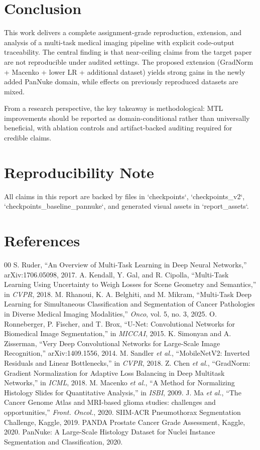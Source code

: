 \documentclass[conference]{IEEEtran}
\begin{document}
\section{Conclusion}
This work delivers a complete assignment-grade reproduction, extension, and analysis of a multi-task medical imaging pipeline with explicit code-output traceability. The central finding is that near-ceiling claims from the target paper are not reproducible under audited settings. The proposed extension (GradNorm + Macenko + lower LR + additional dataset) yields strong gains in the newly added PanNuke domain, while effects on previously reproduced datasets are mixed.

From a research perspective, the key takeaway is methodological: MTL improvements should be reported as domain-conditional rather than universally beneficial, with ablation controls and artifact-backed auditing required for credible claims.

\section*{Reproducibility Note}
All claims in this report are backed by files in `checkpoints`, `checkpoints\_v2`, `checkpoints\_baseline\_pannuke`, and generated visual assets in `report\_assets`.

\section*{References}

\begin{thebibliography}{00}
 S. Ruder, ``An Overview of Multi-Task Learning in Deep Neural Networks,'' arXiv:1706.05098, 2017.
 A. Kendall, Y. Gal, and R. Cipolla, ``Multi-Task Learning Using Uncertainty to Weigh Losses for Scene Geometry and Semantics,'' in \textit{CVPR}, 2018.
 M. Rhanoui, K. A. Belghiti, and M. Mikram, ``Multi-Task Deep Learning for Simultaneous Classification and Segmentation of Cancer Pathologies in Diverse Medical Imaging Modalities,'' \textit{Onco}, vol. 5, no. 3, 2025.
 O. Ronneberger, P. Fischer, and T. Brox, ``U-Net: Convolutional Networks for Biomedical Image Segmentation,'' in \textit{MICCAI}, 2015.
 K. Simonyan and A. Zisserman, ``Very Deep Convolutional Networks for Large-Scale Image Recognition,'' arXiv:1409.1556, 2014.
 M. Sandler \textit{et al.}, ``MobileNetV2: Inverted Residuals and Linear Bottlenecks,'' in \textit{CVPR}, 2018.
 Z. Chen \textit{et al.}, ``GradNorm: Gradient Normalization for Adaptive Loss Balancing in Deep Multitask Networks,'' in \textit{ICML}, 2018.
 M. Macenko \textit{et al.}, ``A Method for Normalizing Histology Slides for Quantitative Analysis,'' in \textit{ISBI}, 2009.
 J. Ma \textit{et al.}, ``The Cancer Genome Atlas and MRI-based glioma studies: challenges and opportunities,'' \textit{Front. Oncol.}, 2020.
 SIIM-ACR Pneumothorax Segmentation Challenge, Kaggle, 2019.
 PANDA Prostate Cancer Grade Assessment, Kaggle, 2020.
 PanNuke: A Large-Scale Histology Dataset for Nuclei Instance Segmentation and Classification, 2020.
\end{thebibliography}
\end{document}
